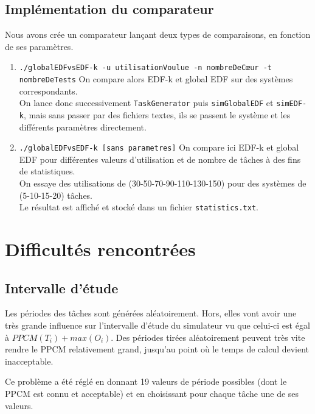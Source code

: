 \documentclass[a4paper,10pt]{article}
\begin{document}
	\subsection{Implémentation du comparateur}
		Nous avons crée un comparateur lançant deux types de comparaisons, en fonction de ses paramètres.
		\begin{enumerate}
			\item \verb?./globalEDFvsEDF-k -u utilisationVoulue -n nombreDeCœur -t nombreDeTests?
					On compare alors EDF-k et global EDF sur des systèmes correspondants.\\
					On lance donc successivement \verb?TaskGenerator? puis \verb?simGlobalEDF? et \verb?simEDF-k?, mais sans passer par des fichiers textes, ils se passent le système et les différents paramètres directement.
			\item \verb?./globalEDFvsEDF-k [sans parametres]?
					On compare ici EDF-k et global EDF pour différentes valeurs d'utilisation et de nombre de tâches à des fins de statistiques.\\
					On essaye des utilisations de (30-50-70-90-110-130-150) pour des systèmes de (5-10-15-20) tâches.\\
					Le résultat est affiché et stocké dans un fichier \verb?statistics.txt?.
		\end{enumerate}
		
		
\section{Difficultés rencontrées}

	\subsection{Intervalle d'étude}

		Les périodes des tâches sont générées aléatoirement. Hors, elles vont avoir une très grande influence sur l'intervalle d'étude du simulateur vu que 		celui-ci est égal à $PPCM(T_i)+ max(O_i)$. Des périodes tirées aléatoirement peuvent très vite rendre le PPCM relativement grand, jusqu'au point où 		le temps de calcul devient inacceptable.

		Ce problème a été réglé en donnant 19 valeurs de période possibles (dont le PPCM est connu et acceptable) et en choisissant pour chaque tâche une 			de ses valeurs.\\
\end{document}

